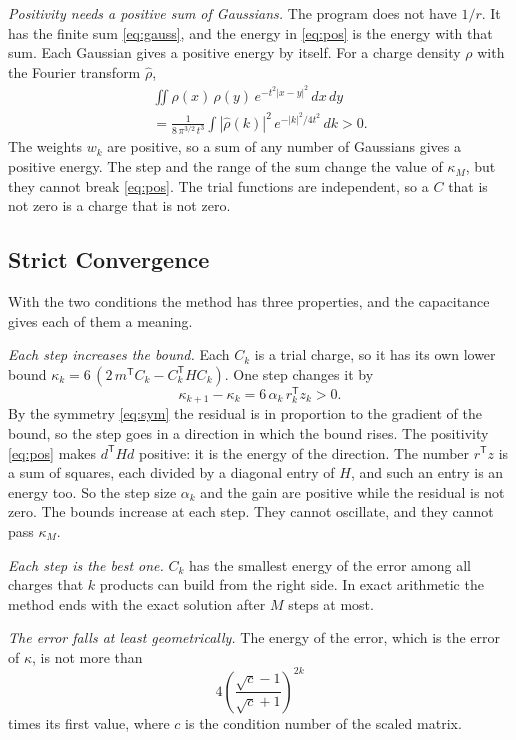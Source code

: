 \documentclass[journal]{IEEEtran}
\newcommand{\T}{\mathsf T}
\begin{document}
\emph{Positivity needs a positive sum of Gaussians.} The program does not have $1/r$. It has the finite sum \eqref{eq:gauss}, and the energy in \eqref{eq:pos} is the energy with that sum. Each Gaussian gives a positive energy by itself. For a charge density $\rho$ with the Fourier transform $\hat\rho$,
\begin{multline}
\iint \rho(x)\,\rho(y)\, e^{-t^2 |x-y|^2}\, dx\, dy \\
= \frac{1}{8\,\pi^{3/2}\, t^3} \int |\hat\rho(k)|^2\, e^{-|k|^2/4t^2}\, dk > 0 .
\label{eq:fourier}
\end{multline}
The weights $w_k$ are positive, so a sum of any number of Gaussians gives a positive energy. The step and the range of the sum change the value of $\kappa_M$, but they cannot break \eqref{eq:pos}. The trial functions are independent, so a $C$ that is not zero is a charge that is not zero.

\subsection{Strict Convergence}
With the two conditions the method has three properties, and the capacitance gives each of them a meaning.

\emph{Each step increases the bound.} Each $C_k$ is a trial charge, so it has its own lower bound $\kappa_k = 6\,(2\,m^{\T}C_k - C_k^{\T}HC_k)$. One step changes it by
\begin{equation}
\kappa_{k+1} - \kappa_k = 6\,\alpha_k\, r_k^{\T} z_k > 0 .
\label{eq:gain}
\end{equation}
By the symmetry \eqref{eq:sym} the residual is in proportion to the gradient of the bound, so the step goes in a direction in which the bound rises. The positivity \eqref{eq:pos} makes $d^{\T}Hd$ positive: it is the energy of the direction. The number $r^{\T}z$ is a sum of squares, each divided by a diagonal entry of $H$, and such an entry is an energy too. So the step size $\alpha_k$ and the gain are positive while the residual is not zero. The bounds increase at each step. They cannot oscillate, and they cannot pass $\kappa_M$.

\emph{Each step is the best one.} $C_k$ has the smallest energy of the error among all charges that $k$ products can build from the right side. In exact arithmetic the method ends with the exact solution after $M$ steps at most.

\emph{The error falls at least geometrically.} The energy of the error, which is the error of $\kappa$, is not more than
\begin{equation}
4 \left( \frac{\sqrt c - 1}{\sqrt c + 1} \right)^{2k}
\label{eq:cgbound}
\end{equation}
times its first value, where $c$ is the condition number of the scaled matrix.
\end{document}
